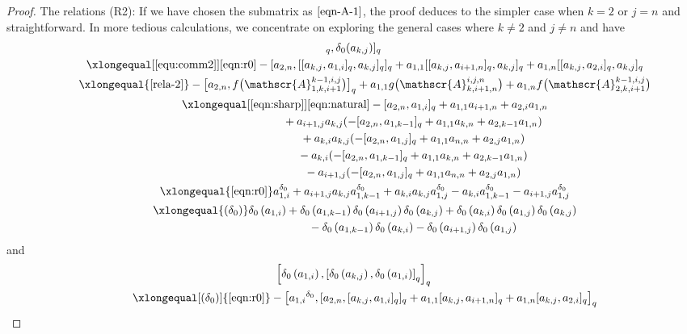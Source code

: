 \documentclass[pdftex]{sigma}
\numberwithin{equation}{section}
\def\lr#1{\left[#1\right]}
\def\lrb#1{\left(#1\right)}
\def\d{\delta}
\def\A{\mathscr{A}}
\begin{document}
\begin{proof}
The relations (R2): If we have chosen the submatrix \smash{$\A_{1,k,i+1}^{k-1,i,j}$} as $\eqref{eqn-A-1}$, the proof deduces to the simpler case when $k=2$ or $j=n$ and straightforward.
In more tedious calculations, we concentrate on exploring the general cases where $k\neq 2$ and $j \neq n$ and have
\begin{gather*}
 [ [\d_0 (a_{k,j} ),\d_0 (a_{1,i} ) ]_q, \d_0 (a_{k,j} ) ]_q\\
\qquad \xlongequal[\eqref{equ:comm2}]{\eqref{eqn:r0}} - [a_{2,n}, [ [a_{k,j}, a_{1,i} ]_q, a_{k,j} ]_q ]_q +a_{1,1} [ [a_{k,j}, a_{i+1,n} ]_q, a_{k,j} ]_q +a_{1,n} [ [a_{k,j}, a_{2,i} ]_q, a_{k,j} ]_q\\
\qquad \xlongequal{\eqref{rela-2}} - \bigl[a_{2,n},f\bigl(\A_{1,k,i+1}^{k-1,i,j}\bigr) \bigr]_q
+a_{1,1}g\bigl(\A_{k,i+1,n}^{i,j,n}\bigr) +a_{1,n}f\bigl(\A_{2,k,i+1}^{k-1,i,j}\bigr)\\
 \qquad\xlongequal[\eqref{eqn:sharp}]{\eqref{eqn:natural}} - [a_{2,n}, a_{1,i} ]_q+a_{1,1}a_{i+1,n}+a_{2,i}a_{1,n} \\
\phantom{\qquad \xlongequal{\qquad}\!\! }{} +a_{i+1,j}a_{k,j} (- [a_{2,n}, a_{1,k-1} ]_q+a_{1,1}a_{k,n} +a_{2,k-1}a_{1,n} ) \\
\phantom{\qquad \xlongequal{\qquad}\!\! }{} +a_{k,i}a_{k,j} (- [a_{2,n}, a_{1,j} ]_q+a_{1,1}a_{n,n}+a_{2,j}a_{1,n} ) \\
\phantom{\qquad \xlongequal{\qquad}\!\! }{} -a_{k,i} (- [a_{2,n},a_{1,k-1} ]_q+a_{1,1}a_{k,n}+a_{2,k-1}a_{1,n} ) \\
\phantom{\qquad \xlongequal{\qquad}\!\! }{} -a_{i+1,j} (- [a_{2,n}, a_{1,j} ]_q+a_{1,1}a_{n,n}+a_{2,j}a_{1,n} ) \\
 \qquad\xlongequal{\eqref{eqn:r0}} a_{1,i}^{\d_0}+ a_{i+1,j}a_{k,j} a_{1,k-1}^{\d_0} +a_{k,i}a_{k,j}a_{1,j}^{\d_0}-a_{k,i}a_{1,k-1}^{\d_0}-a_{i+1,j}a_{1,j}^{\d_0}\\
 \qquad\xlongequal{(\d_0)} \d_0\lrb{a_{1,i}}+\d_0\lrb{a_{1,k-1}}\d_0\lrb{a_{i+1,j}}\d_0\lrb{a_{k,j}} +\d_0\lrb{a_{k,i}}\d_0\lrb{a_{1,j}}\d_0\lrb{a_{k,j}}\\
 \phantom{ \qquad\xlongequal{\qquad}\!\! }{} -\d_0\lrb{a_{1,k-1}}\d_0\lrb{a_{k,i}} -\d_0\lrb{a_{i+1,j}}\d_0\lrb{a_{1,j}}
\end{gather*}
and
\begin{gather*}
 \lr{\d_0\lrb{a_{1,i}},\lr{\d_0\lrb{a_{k,j}},\d_0\lrb{a_{1,i}}}_q}_q \\
\qquad \xlongequal[(\d_0)]{\eqref{eqn:r0}} - \bigl[{a_{1,i}}^{\d_0}, [a_{2,n}, [a_{k,j},a_{1,i} ]_q ]_q +a_{1,1} [a_{k,j},a_{i+1,n} ]_q +a_{1,n} [a_{k,j},a_{2,i} ]_q \bigr]_q\\

\end{gather*}
\end{proof}
\end{document}
